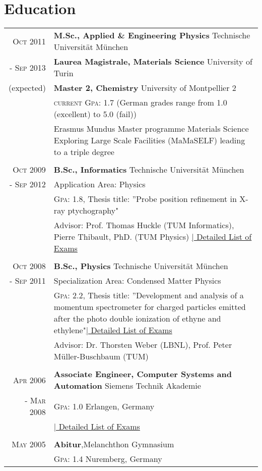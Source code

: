 \documentclass[a4paper,10pt]{article}
\begin{document}
\section{Education}
\begin{tabularx}{19cm}{rX}	

\textsc{Oct 2011}& \textbf{M.Sc., Applied \& Engineering Physics} \hfill{Technische Universität München}\\
\textsc{- Sep 2013} & \textbf{Laurea Magistrale, Materials Science} \hfill{University of Turin}\\
 (expected)&  \textbf{Master 2, Chemistry} \hfill{University of Montpellier 2}\\
 &  \textsc{current Gpa}: 1.7 (German grades range from 1.0 \small{(excellent)} to 5.0 \small{(fail)})\\& \small{Erasmus Mundus Master programme Materials Science Exploring Large Scale Facilities (MaMaSELF) leading to a
triple degree}\\\\

\textsc{Oct 2009}& \textbf{B.Sc., Informatics} \hfill{Technische Universität München}\\
\textsc{- Sep 2012} & Application Area: Physics\\
 & \textsc{Gpa}: 1.8, \small{Thesis title: ”Probe position refinement in X-ray ptychography"}\\
& Advisor: Prof. Thomas Huckle (TUM Informatics), Pierre Thibault, PhD. (TUM Physics)
\hyperlink{grds_studies}{\hfill |\footnotesize{ Detailed List of Exams}}
\\\\

\textsc{Oct 2008}& \textbf{B.Sc.,  Physics} \hfill\normalsize{Technische Universität München}\\
 \textsc{- Sep 2011}& Specialization Area: Condensed Matter Physics \\
& \textsc{Gpa}: 2.2, \small{Thesis title: ”Development and analysis of a momentum spectrometer for charged particles emitted after the photo double ionization of ethyne and ethylene"}\hyperlink{physicsBSC}{\hfill |\footnotesize{ Detailed List of Exams}}\\
& Advisor: Dr. Thorsten Weber (LBNL),  Prof. Peter Müller-Buschbaum (TUM) \\\\


\textsc{Apr 2006}& \textbf{Associate Engineer, Computer Systems and Automation} \hfill  {Siemens Technik Akademie}\\
\textsc{- Mar 2008}& \textsc{Gpa}: 1.0  \hfill Erlangen, Germany\\
 &\hyperlink{grds_siemens}{\hfill| \footnotesize Detailed List of Exams}\\ \\

\textsc{May} 2005& \textbf{Abitur},\hfill  Melanchthon Gymnasium \\
&  \textsc{Gpa}: 1.4 \hfill Nuremberg, Germany

\end{tabularx}
\end{document}

